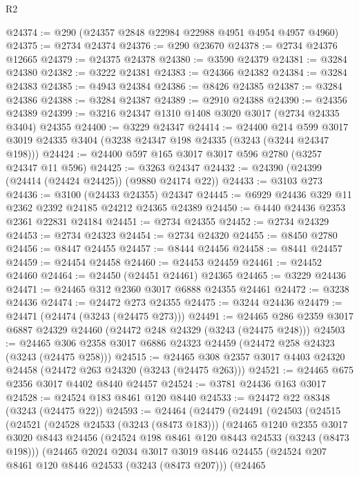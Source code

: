 \begin{lexlean}{R2}
\begin{coremodule}
@24374 := @290 (@24357 @2848 @22984 @22988 @4951 @4954 @4957 @4960)
@24375 := @2734 @24374
@24376 := @290 @23670
@24378 := @2734 @24376 @12665
@24379 := @24375 @24378
@24380 := @3590 @24379
@24381 := @3284 @24380
@24382 := @3222 @24381
@24383 := @24366 @24382
@24384 := @3284 @24383
@24385 := @4943 @24384
@24386 := @8426 @24385
@24387 := @3284 @24386
@24388 := @3284 @24387
@24389 := @2910 @24388
@24390 := @24356 @24389
@24399 := @3216 @24347 @1310 @1408 @3020 @3017 (@2734 @24335 @3404) @24355
@24400 := @3229 @24347
@24414 := @24400
    @214
    @599
    @3017
    @3019
    @24335
    @3404
    (@3238 @24347 @198 @24335 (@3243 (@3244 @24347 @198)))
@24424 := @24400 @597 @165 @3017 @3017 @596 @2780 (@3257 @24347 @11 @596)
@24425 := @3263 @24347
@24432 := @24390 (@24399 (@24414 (@24424 @24425)) (@9880 @24174 @22))
@24433 := @3103 @273
@24436 := @3100 (@24433 @24355) @24347
@24445 := @6929 @24436 @329 @11 @2362 @2392 @24185 @24212 @24365 @24389
@24450 := @4440 @24436 @2353 @2361 @22831 @24184
@24451 := @2734 @24355
@24452 := @2734 @24329
@24453 := @2734 @24323
@24454 := @2734 @24320
@24455 := @8450 @2780
@24456 := @8447 @24455
@24457 := @8444 @24456
@24458 := @8441 @24457
@24459 := @24454 @24458
@24460 := @24453 @24459
@24461 := @24452 @24460
@24464 := @24450 (@24451 @24461) @24365
@24465 := @3229 @24436
@24471 := @24465 @312 @2360 @3017 @6888 @24355 @24461
@24472 := @3238 @24436
@24474 := @24472 @273 @24355
@24475 := @3244 @24436
@24479 := @24471 (@24474 (@3243 (@24475 @273)))
@24491 := @24465 @286 @2359 @3017 @6887 @24329 @24460 (@24472 @248 @24329 (@3243 (@24475 @248)))
@24503 := @24465 @306 @2358 @3017 @6886 @24323 @24459 (@24472 @258 @24323 (@3243 (@24475 @258)))
@24515 := @24465 @308 @2357 @3017 @4403 @24320 @24458 (@24472 @263 @24320 (@3243 (@24475 @263)))
@24521 := @24465 @675 @2356 @3017 @4402 @8440 @24457
@24524 := @3781 @24436 @163 @3017
@24528 := @24524 @183 @8461 @120 @8440
@24533 := @24472 @22 @8348 (@3243 (@24475 @22))
@24593 := @24464
    (@24479
      (@24491
        (@24503
          (@24515
            (@24521
              (@24528 @24533 (@3243 (@8473 @183)))
              (@24465
                @1240
                @2355
                @3017
                @3020
                @8443
                @24456
                (@24524 @198 @8461 @120 @8443 @24533 (@3243 (@8473 @198)))
                (@24465
                  @2024
                  @2034
                  @3017
                  @3019
                  @8446
                  @24455
                  (@24524 @207 @8461 @120 @8446 @24533 (@3243 (@8473 @207)))
                  (@24465

\end{coremodule}
\end{lexlean}
